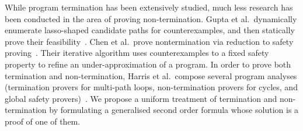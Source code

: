 \documentclass[preprint]{sigplanconf}
\theoremstyle{definition}
\begin{document}
While program termination has been extensively studied, much less research
has been conducted in the area of proving non-termination.  Gupta et
al.~dynamically enumerate lasso-shaped candidate paths for counterexamples,
and then statically prove their
feasibility~\cite{DBLP:conf/popl/GuptaHMRX08}.  Chen et al.~prove
nontermination via reduction to safety
proving~\cite{DBLP:conf/tacas/ChenCFNO14}.  Their iterative algorithm uses
counterexamples to a fixed safety property to refine an under-approximation
of a program.  In order to prove both termination and non-termination,
Harris et al.~compose several program analyses (termination provers for
multi-path loops, non-termination provers for cycles, and global safety
provers)~\cite{DBLP:conf/sas/HarrisLNR10}.  We propose a uniform treatment
of termination and non-termination by formulating a generalised second order
formula whose solution is a proof of one of them.


{}
\end{document}
